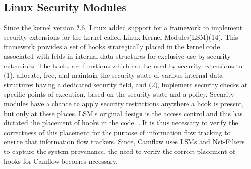 \subsection{Linux Security Modules}
\label{LSMs}
Since the kernel version 2.6, Linux added support for a framework to implement security extensions for the kernel called Linux Kernel Modules(LSM)(14). This framework provides a set of hooks strategically
placed in the kernel code associated with felds in internal data
structures for exclusive use by security extensions. The hooks are
functions which can be used by security extensions to (1), allocate,
free, and maintain the security state of various internal data structures having a dedicated security field, and (2), implement security
checks at specific points of execution, based on the security state
and a policy.  Security modules have a chance to apply security
restrictions anywhere a hook is present, but only at these places.
LSM’s original design is the access control and this has dictated the
placement of hooks in the code. . It is thus necessary to verify the
correctness of this placement for the purpose of information flow
tracking to ensure that information flow trackers. 
\vskip 0.2in
Since, Camflow uses LSMs and Net-Filters to capture the system provenance, the need to verify the correct placement of hooks for Camflow becomes necessary. 



